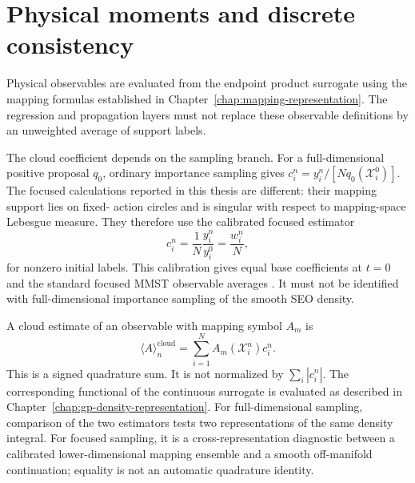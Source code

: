\documentclass[
  11pt,
  letterpaper,
  onehalfspacing,
  normalmargins,
  equalmargins,
  oneside
]{ut-thesis}
\begin{document}
\section{Physical moments and discrete consistency}
\label{sec:ch5-moments}

Physical observables are evaluated from the endpoint product surrogate using
the mapping formulas established in
Chapter~\ref{chap:mapping-representation}. The regression and propagation
layers must not replace these observable definitions by an unweighted average
of support labels.

The cloud coefficient depends on the sampling branch. For a full-dimensional
positive proposal \(q_0\), ordinary importance sampling gives
\(c_i^n=y_i^n/[Nq_0(\boldsymbol{\mathcal X}_i^0)]\). The focused calculations
reported in this thesis are different: their mapping support lies on fixed-
action circles and is singular with respect to mapping-space Lebesgue measure.
They therefore use the calibrated focused estimator
\begin{equation}
c_i^n
=
\frac{1}{N}\frac{y_i^n}{y_i^0}
=
\frac{w_i^n}{N},
\label{eq:ch5-focused-cloud-coefficient}
\end{equation}
for nonzero initial labels. This calibration gives equal base coefficients at
\(t=0\) and the standard focused MMST observable averages
\cite{StockThoss1997PRL,ThossStock1999PRA,Kelly2012JCP}. It must not be
identified with full-dimensional importance sampling of the smooth SEO
density.

A cloud estimate of an observable with mapping symbol \(A_m\) is
\begin{equation}
\langle A\rangle_n^{\mathrm{cloud}}
=
\sum_{i=1}^{N}
A_m(\boldsymbol{\mathcal X}_i^n)
c_i^n.
\label{eq:ch5-cloud-observable}
\end{equation}
This is a signed quadrature sum. It is not normalized by
\(\sum_i|c_i^n|\). The corresponding functional of the continuous surrogate
is evaluated as described in Chapter~\ref{chap:gp-density-representation}.
For full-dimensional sampling, comparison of the two estimators tests two
representations of the same density integral. For focused sampling, it is a
cross-representation diagnostic between a calibrated lower-dimensional
mapping ensemble and a smooth off-manifold continuation; equality is not an
automatic quadrature identity.
\end{document}
